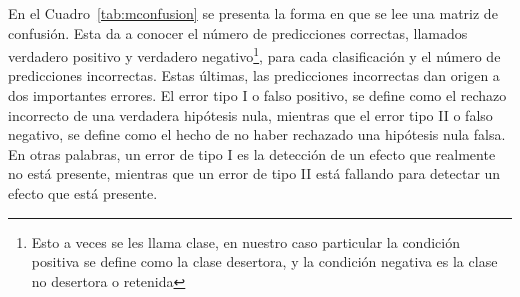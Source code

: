 En el Cuadro~\ref{tab:mconfusion} se presenta la forma en que se lee una matriz de confusión. Esta da a conocer el número de predicciones correctas, llamados verdadero positivo y verdadero negativo\footnote{Esto a veces se les llama clase, en nuestro caso particular la condición positiva se define como la clase desertora, y la condición negativa es la clase no desertora o retenida}, para cada clasificación y el número de predicciones incorrectas. Estas últimas, las predicciones incorrectas dan origen a dos importantes errores. El error tipo I o falso positivo, se define como el rechazo incorrecto de una verdadera hipótesis nula, mientras que el error tipo II o falso negativo, se define como el hecho de no haber rechazado una hipótesis nula falsa. En otras palabras, un error de tipo I es la detección de un efecto que realmente no está presente, mientras que un error de tipo II está fallando para detectar un efecto que está presente.

